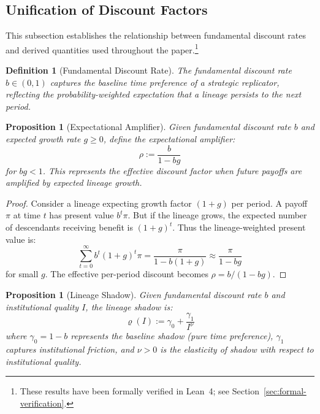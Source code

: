 \documentclass[12pt]{article}
\newtheorem{proposition}[theorem]{Proposition}
\newtheorem{definition}[theorem]{Definition}
\begin{document}
\subsection{Unification of Discount Factors}
\label{app:discount-unification}

This subsection establishes the relationship between fundamental discount rates and derived quantities used throughout the paper.\footnote{These results have been formally verified in Lean~4; see Section~\ref{sec:formal-verification}.}

\begin{definition}[Fundamental Discount Rate]
\label{def:fundamental-discount}
The \emph{fundamental discount rate} $b \in (0, 1)$ captures the baseline time preference of a strategic replicator, reflecting the probability-weighted expectation that a lineage persists to the next period.
\end{definition}

\begin{proposition}[Expectational Amplifier]
\label{prop:expectational-amplifier}
Given fundamental discount rate $b$ and expected growth rate $g \geq 0$, define the \emph{expectational amplifier}:
\[
\rho := \frac{b}{1 - bg}
\]
for $bg < 1$. This represents the effective discount factor when future payoffs are amplified by expected lineage growth.
\end{proposition}

\begin{proof}
Consider a lineage expecting growth factor $(1 + g)$ per period. A payoff $\pi$ at time $t$ has present value $b^t \pi$. But if the lineage grows, the expected number of descendants receiving benefit is $(1 + g)^t$. Thus the lineage-weighted present value is:
\[
\sum_{t=0}^\infty b^t (1 + g)^t \pi = \frac{\pi}{1 - b(1 + g)} \approx \frac{\pi}{1 - bg}
\]
for small $g$. The effective per-period discount becomes $\rho = b/(1 - bg)$.
\end{proof}

\begin{proposition}[Lineage Shadow]
\label{prop:lineage-shadow-derivation}
Given fundamental discount rate $b$ and institutional quality $I$, the \emph{lineage shadow} is:
\[
\varrho(I) := \gamma_0 + \frac{\gamma_1}{I^\nu}
\]
where $\gamma_0 = 1 - b$ represents the baseline shadow (pure time preference), $\gamma_1$ captures institutional friction, and $\nu > 0$ is the elasticity of shadow with respect to institutional quality.
\end{proposition}
\end{document}
